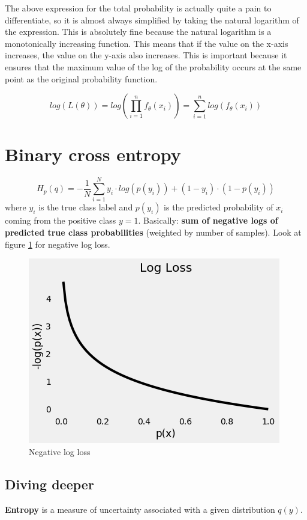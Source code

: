 \documentclass{scrartcl}
\begin{document}
The above expression for the total probability is actually quite a pain to differentiate, so it is almost always simplified by taking the natural logarithm of the expression. This is absolutely fine because the natural logarithm is a monotonically increasing function. This means that if the value on the x-axis increases, the value on the y-axis also increases. This is important because it ensures that the maximum value of the log of the probability occurs at the same point as the original probability function.

$$log(L(\theta)) = log(\prod_{i=1}^n f_{\theta}(x_i)) = \sum_{i=1}^n log(f_{\theta}(x_i))$$

\section[Binary cross entropy]{Binary cross entropy \cite{bce-tds}}
$$H_p(q) = -\frac{1}{N} \sum_{i=1}^N y_i \cdot log(p(y_i)) + (1-y_i) \cdot (1-p(y_i))$$
where $y_i$ is the true class label and $p(y_i)$ is the predicted probability of $x_i$ coming from the positive class $y=1$. Basically: \textbf{sum of negative logs of predicted true class probabilities} (weighted by number of samples). Look at figure \ref{fig:binary_cross_neg_log} for negative log loss.

\begin{figure}
	\centering
		\includegraphics[scale=0.7]{img/binary_cross_neg_log}
	\caption{Negative log loss}
	\label{fig:binary_cross_neg_log}
\end{figure}

\subsection{Diving deeper}
\textbf{Entropy} is a measure of uncertainty associated with a given distribution $q(y)$.
\end{document}
